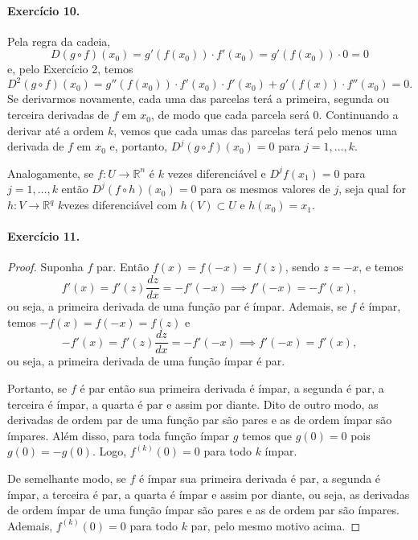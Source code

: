 \documentclass[12pt,a4paper]{article}
\newcommand{\R}{\mathbb{R}}
\begin{document}
\paragraph{Exercício 10.}
    Pela regra da cadeia,
    \begin{equation*}
        D(g\circ f)(x_0) = g'(f(x_0))\cdot f'(x_0) = g'(f(x_0))\cdot 0 = 0
    \end{equation*}
    e, pelo Exercício 2, temos
    \begin{equation*}
        D^2(g\circ f)(x_0) = g''(f(x_0))\cdot f'(x_0)\cdot f'(x_0) + g'(f(x))\cdot f''(x_0) = 0.
    \end{equation*}
    Se derivarmos novamente, cada uma das parcelas terá a primeira, segunda ou terceira derivadas 
    de $f$ em $x_0$, de modo que cada parcela será $0$. Continuando a derivar até a ordem $k$,
    vemos que cada umas das parcelas terá pelo menos uma derivada de $f$ em $x_0$ e, portanto,
    $D^j(g\circ f)(x_0) = 0$ para $j=1,\dots,k$.
    
    Analogamente, se $f:U\to\R^n$ é $k$ vezes diferenciável e $D^jf(x_1) = 0$ para $j=1,\dots,k$
    então $D^j(f\circ h)(x_0) = 0$ para os mesmos valores de $j$, seja qual for $h:V\to\R^q$
    $k$vezes diferenciável com $h(V) \subset U$ e $h(x_0) = x_1$.
\paragraph{Exercício 11.}
    \begin{proof}
        Suponha $f$ par. Então $f(x) = f(-x) = f(z)$, sendo $z=-x$, e temos
        \begin{equation*}
            f'(x) = f'(z)\frac{dz}{dx} = -f'(-x) \implies f'(-x) = -f'(x),
        \end{equation*}
        ou seja, a primeira derivada de uma função par é ímpar. Ademais, se $f$ é ímpar,
        temos $-f(x) = f(-x) = f(z)$ e 
        \begin{equation*}
            -f'(x) = f'(z)\frac{dz}{dx} = -f'(-x) \implies f'(-x) = f'(x),
        \end{equation*}
        ou seja, a primeira derivada de uma função ímpar é par.
        
        Portanto, se $f$ é par então sua primeira derivada é ímpar, a segunda é par, a terceira
        é ímpar, a quarta é par e assim por diante. Dito de outro modo, as derivadas de ordem par
        de uma função par são pares e as de ordem ímpar são ímpares. Além disso, para toda função
        ímpar $g$ temos que $g(0) = 0$ pois $g(0) = -g(0)$. Logo, $f^{(k)}(0) = 0$ para todo $k$
        ímpar.
        
        De semelhante modo, se $f$ é ímpar sua primeira derivada é par, a segunda é ímpar, a terceira
        é par, a quarta é ímpar e assim por diante, ou seja, as derivadas de ordem ímpar de uma função
        ímpar são pares e as de ordem par são ímpares. Ademais, $f^{(k)}(0) = 0$ para todo $k$ par,
        pelo mesmo motivo acima.
    \end{proof}
\end{document}
